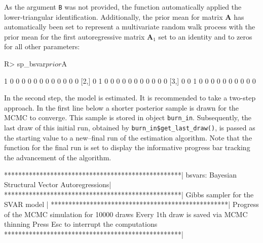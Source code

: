 \documentclass[
  nojss]{jss}
\begin{document}
As the argument \texttt{B} was not provided, the function automatically
applied the lower-triangular identification. Additionally, the prior
mean for matrix \(\mathbf{A}\) has automatically been set to represent a
multivariate random walk process with the prior mean for the first
autoregressive matrix \(\mathbf{A}_1\) set to an identity and to zeros
for all other parameters:

\begin{CodeChunk}
\begin{CodeInput}
R> sp_bsvar$prior$A
\end{CodeInput}
\begin{CodeOutput}
     [,1] [,2] [,3] [,4] [,5] [,6] [,7] [,8] [,9] [,10] [,11] [,12] [,13]
[1,]    1    0    0    0    0    0    0    0    0     0     0     0     0
[2,]    0    1    0    0    0    0    0    0    0     0     0     0     0
[3,]    0    0    1    0    0    0    0    0    0     0     0     0     0
\end{CodeOutput}
\end{CodeChunk}

In the second step, the model is estimated. It is recommended to take a
two-step approach. In the first line below a shorter posterior sample is
drawn for the MCMC to converge. This sample is stored in object
\texttt{burn\_in}. Subsequently, the last draw of this initial run,
obtained by \texttt{burn\_in\$get\_last\_draw()}, is passed as the
starting value to a new--final run of the estimation algorithm. Note
that the function for the final run is set to display the informative
progress bar tracking the advancement of the algorithm.

\begin{CodeChunk}
\begin{CodeOutput}
**************************************************|
bsvars: Bayesian Structural Vector Autoregressions|
**************************************************|
 Gibbs sampler for the SVAR model                 |
**************************************************|
 Progress of the MCMC simulation for 10000 draws
    Every 1th draw is saved via MCMC thinning
 Press Esc to interrupt the computations
**************************************************|
\end{CodeOutput}
\end{CodeChunk}
\end{document}

